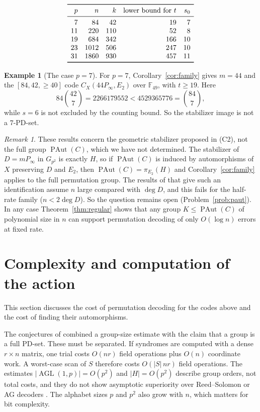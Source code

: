 \documentclass[12pt,letterpaper]{article}
\theoremstyle{definition}
\newtheorem{example}[theorem]{Example}
\theoremstyle{remark}
\newtheorem{remark}[theorem]{Remark}
\numberwithin{equation}{section}
\newcommand{\F}{\mathbb{F}}
\newcommand{\PAut}{\operatorname{PAut}}
\newcommand{\AGL}{\operatorname{AGL}}
\begin{document}
\[
\begin{array}{rrrrr}
\toprule
p & n & k & \text{lower bound for }t & s_0\\
\midrule
7 & 84 & 42 & 19 & 7\\
11 & 220 & 110 & 52 & 8\\
19 & 684 & 342 & 166 & 10\\
23 & 1012 & 506 & 247 & 10\\
31 & 1860 & 930 & 457 & 11\\
\bottomrule
\end{array}
\]

\begin{example}[The case $p=7$]\label{ex:p7}
For $p=7$, Corollary~\ref{cor:family} gives $m=44$ and the
$[84,42,\ge40]$ code $C_X(44P_\infty,E_2)$ over $\F_{49}$, with $t\ge19$.
Here
\[
84\binom{42}{7}=2266179552<4529365776=\binom{84}{7},
\]
while $s=6$ is not excluded by the counting bound.  So the stabilizer
image is not a $7$-PD-set.
\end{example}

\begin{remark}
These results concern the geometric stabilizer proposed in (C2), not the
full group $\PAut(C)$, which we have not determined.  The stabilizer of
$D=mP_\infty$ in $G_{p^2}$ is exactly $H$, so if $\PAut(C)$ is induced by
automorphisms of $X$ preserving $D$ and $E_2$, then
$\PAut(C)=\pi_{E_2}(H)$ and Corollary~\ref{cor:family} applies to the full
permutation group.  The results of \cite{We98,JK06} that give such an
identification assume $n$ large compared with $\deg D$, and this fails
for the half-rate family ($n<2\deg D$).  So the question remains open
(Problem~\ref{prob:paut}).  In any case Theorem~\ref{thm:regular} shows
that any group $K\le\PAut(C)$ of polynomial size in $n$ can support
permutation decoding of only $O(\log n)$ errors at fixed rate.
\end{remark}

\section{Complexity and computation of the action}\label{sec:complexity}

This section discusses the cost of permutation decoding for the codes
above and the cost of finding their automorphisms.

The conjectures of \cite{Jo05} combined a group-size estimate with the
claim that a group is a full PD-set.  These must be separated.  If
syndromes are computed with a dense $r\times n$ matrix, one trial costs
$O(nr)$ field operations plus $O(n)$ coordinate work.  A worst-case scan
of $S$ therefore costs $O(|S|\,nr)$ field operations.  The estimates
$|\AGL(1,p)|=O(p^2)$ and $|H|=O(p^2)$ describe group orders, not total
costs, and they do not show asymptotic superiority over Reed--Solomon or
AG decoders \cite{HvLP98,GS99}.  The alphabet sizes $p$ and $p^2$ also grow
with $n$, which matters for bit complexity.
\end{document}
